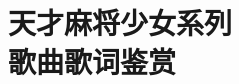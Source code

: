 
\part[天麻歌赏]{{\rm\sffamily\hei 天才麻将少女系列\\歌曲歌词鉴赏}}
\setcounter{chapter}{0}

\renewcommand{\B}[1]{{\bfseries{#1}}}

\newcommand{\album}[1]{\def\albumName{#1}\addcontentsline{toc}{chapter}{\shingo #1}}
\newcommand{\songTitle}[2]{\clearpage\addcontentsline{toc}{section}{\mincho #1}{\Large\maru\B{#1}\quad{\rm\small\outai #2}}\par}
\newcommand{\songTitled}[3]{\clearpage\addcontentsline{toc}{section}{\mincho #1}
{\rm\tiny\mincho{#3}}\par
{\Large\maru\B{#1}\quad{\rm\small\outai #2}}\par}
\newcommand{\songMemo}[1]{{\rm\small\tsuku{#1}}\par}
\newcommand{\songText}[1]{\begin{multicols}{2}{#1}\end{multicols}}
\newcommand{\songTexts}[2]{\begin{multicols}{#1}{#2}\end{multicols}}
\newcommand{\newcolumn}{\vfill\null
\columnbreak}

\CTEXnoindent


% 
% 

% 
% 

% 
% 


